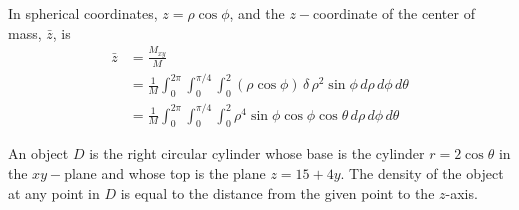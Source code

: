 \begin{parts}
    \ifnum {} {\color{DarkBlue} In spherical coordinates, $z = \rho \cos\phi$, and the $z-$coordinate of the center of mass, $\bar z$, is
    \begin{align}
    \bar z &= \frac{M_{xy}}{M} \\ 
    &= \frac{1}{M} \int_0^{2\pi} \int_0^{\pi/4} \int_0^2 (\rho \cos\phi) \, \delta \, \rho^2\sin\phi \, d\rho\,d\phi\,d\theta \\
    &= \frac{1}{M} \int_0^{2\pi} \int_0^{\pi/4} \int_0^2 \rho^4\sin\phi\cos\phi \cos\theta \, d\rho\,d\phi\,d\theta 
    \end{align}
    } 
    \else
      
    \fi
    \end{parts} 

\fi 



\ifnum {}
\question[6] An object $D$ is the right circular cylinder whose base is the cylinder $r=2\cos\theta$ in the $xy-$plane and whose top is the plane $z=15+4y$. The density of the object at any point in $D$ is equal to the distance from the given point to the $z$-axis. 

